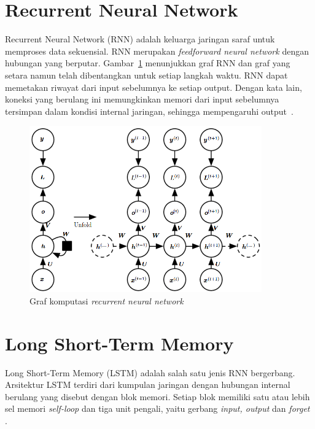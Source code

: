 \section{Recurrent Neural Network}
Recurrent Neural Network (RNN) adalah keluarga jaringan saraf untuk memproses data sekuensial. RNN merupakan \textit{feedforward neural network} dengan hubungan yang berputar. Gambar~\ref{gambar:rnn} menunjukkan graf RNN dan graf yang setara namun telah dibentangkan untuk setiap langkah waktu. RNN dapat memetakan riwayat dari input sebelumnya ke setiap output. Dengan kata lain, koneksi yang berulang ini memungkinkan memori dari input sebelumnya tersimpan dalam kondisi internal jaringan, sehingga mempengaruhi output~\citep{graves-2012}.

\begin{figure}
    \centering
    \includegraphics[width=10cm]{gambar/landasan-teori/rnn.png}
    \caption{Graf komputasi \textit{recurrent neural network} \citep{goodfellow-2016}}
    \label{gambar:rnn}
\end{figure}


\section{Long Short-Term Memory}
Long Short-Term Memory (LSTM) adalah salah satu jenis RNN bergerbang. Arsitektur LSTM terdiri dari kumpulan jaringan dengan hubungan internal berulang yang disebut dengan blok memori. Setiap blok memiliki satu atau lebih sel memori \textit{self-loop} dan tiga unit pengali, yaitu gerbang \textit{input, output} dan \textit{forget} \citep{graves-2012}.

